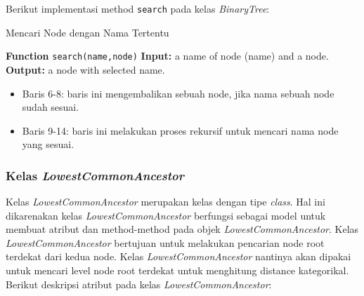 \noindent Berikut implementasi method \texttt{search} pada kelas \textit{BinaryTree}:

\begin{minipage}{.8\linewidth}
\begin{algorithm}[H]
  \caption{Mencari Node dengan Nama Tertentu}\label{alg:4}
  \begin{algorithmic}[1]
  \State \textbf{Function} \texttt{search(name,node)}
  \State \textbf{Input:} a name of node (name) and a node.
  \State \textbf{Output:} a node with selected name.
  \\
  	\Else 
  		\EndIf
  	\EndIf
  \Else 
  \EndIf
  \end{algorithmic}
\end{algorithm}
\end{minipage}

\vspace{0.2cm}
\begin{itemize}
\item Baris 6-8: baris ini mengembalikan sebuah node, jika nama sebuah node sudah sesuai.
\item Baris 9-14: baris ini melakukan proses rekursif untuk mencari nama node yang sesuai.
\end{itemize}

\newpage
\subsubsection{Kelas \textit{LowestCommonAncestor}}
Kelas \textit{LowestCommonAncestor} merupakan kelas dengan tipe \textit{class}. Hal ini dikarenakan kelas \textit{LowestCommonAncestor} berfungsi sebagai model untuk membuat atribut dan method-method pada objek \textit{LowestCommonAncestor}. Kelas \textit{LowestCommonAncestor} bertujuan untuk melakukan pencarian node root terdekat dari kedua node. Kelas \textit{LowestCommonAncestor} nantinya akan dipakai untuk mencari level node root terdekat untuk menghitung distance kategorikal.\\

\noindent Berikut deskripsi atribut pada kelas \textit{LowestCommonAncestor}:


